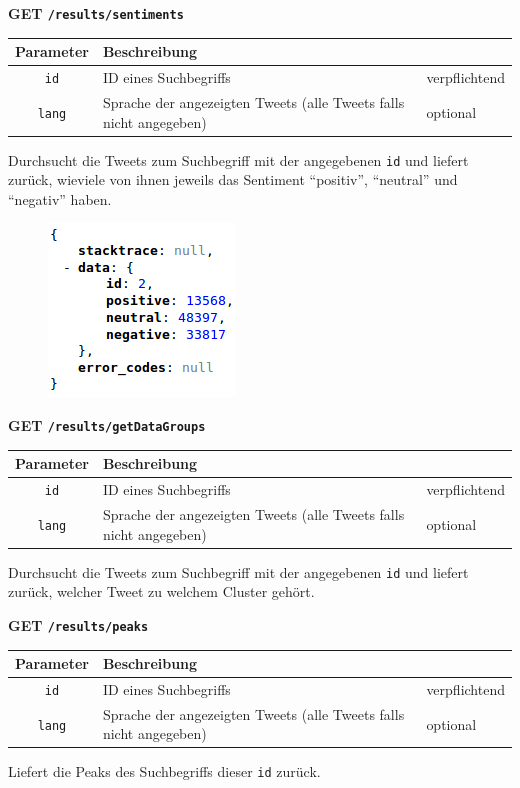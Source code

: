 \noindent
\textbf{GET \texttt{/results/sentiments}}
\begin{table}[h!]
\begin{tabular}{| c | p{\tweite} | l |}
\hline
	\textbf{Parameter} & \textbf{Beschreibung} &  \\
\hline \hline
 	\texttt{id} & ID eines Suchbegriffs & verpflichtend \\
\hline
 	\texttt{lang} & Sprache der angezeigten Tweets (alle Tweets falls nicht angegeben) & optional \\
\hline
\end{tabular}
\end{table}
\newline
Durchsucht die Tweets zum Suchbegriff mit der angegebenen \texttt{id} und liefert zurück, wieviele von ihnen jeweils das Sentiment "`positiv"', "`neutral"' und "`negativ"' haben.
\begin{figure}[h!]
\includegraphics[scale=0.6]{Bilder/RestApi/resultsSentiment.png}
\end{figure}

\noindent
\textbf{GET \texttt{/results/getDataGroups}}
\begin{table}[h!]
\begin{tabular}{| c | p{\tweite} | l |}
\hline
	\textbf{Parameter} & \textbf{Beschreibung} &  \\
\hline \hline
 	\texttt{id} & ID eines Suchbegriffs & verpflichtend \\
\hline
 	\texttt{lang} & Sprache der angezeigten Tweets (alle Tweets falls nicht angegeben) & optional \\
\hline
\end{tabular}
\end{table}
\newline
Durchsucht die Tweets zum Suchbegriff mit der angegebenen \texttt{id} und liefert zurück, welcher Tweet zu welchem Cluster gehört.

\newpage
\noindent
\textbf{GET \texttt{/results/peaks}}
\begin{table}[h!]
\begin{tabular}{| c | p{\tweite} | l |}
\hline
	\textbf{Parameter} & \textbf{Beschreibung} &  \\
\hline \hline
 	\texttt{id} & ID eines Suchbegriffs & verpflichtend \\
\hline
 	\texttt{lang} & Sprache der angezeigten Tweets (alle Tweets falls nicht angegeben) & optional \\
\hline
\end{tabular}
\end{table}
\newline
Liefert die Peaks des Suchbegriffs dieser \texttt{id} zurück.

